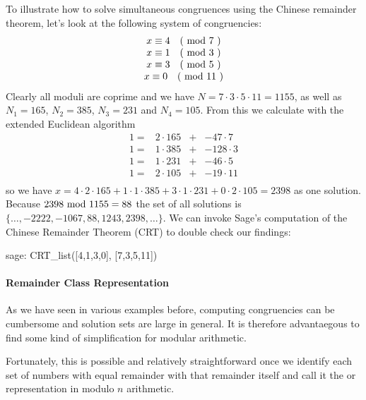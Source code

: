 \begin{example} To illustrate how to solve simultaneous congruences using the Chinese remainder theorem, let's look at the following system of congruencies:
$$
\begin{array}{c}
x \equiv 4 \quad \text{( mod } 7 \text{ )} \\
x \equiv 1 \quad \text{( mod } 3 \text{ )} \\
x \equiv 3 \quad \text{( mod } 5 \text{ )} \\
x \equiv 0 \quad \text{( mod } 11 \text{ )} \\
\end{array}
$$
Clearly all moduli are coprime and we have $ N = 7 \cdot 3 \cdot 5 \cdot 11 = 1155 $, as well as
$ N_1 = 165 $, $ N_2 = 385 $, $ N_3 = 231 $ and $ N_4 = 105 $. From this we calculate with the extended Euclidean algorithm
$$
\begin{array}{cccc}
 1 = & 2 \cdot 165  & + & -47 \cdot 7 \\
 1 = & 1 \cdot 385  & + &  -128 \cdot 3 \\
 1 = & 1 \cdot 231  & + &  -46 \cdot 5 \\
 1 = & 2 \cdot 105  & + &  -19 \cdot 11 \\
\end{array}
$$
so we have
$x = 4 \cdot 2 \cdot 165 + 1 \cdot 1 \cdot 385 + 3 \cdot 1 \cdot 231 + 0 \cdot 2 \cdot 105 = 2398$
as one solution. Because $ 2398 \text{ mod } 1155 = 88 $ the set of all solutions is
$ \{\ldots, -2222, -1067,88,1243, 2398, \ldots \} $. We can invoke Sage's computation of the Chinese Remainder Theorem (CRT) to double check our findings:
\begin{sagecommandline}
sage: CRT_list([4,1,3,0], [7,3,5,11])
\end{sagecommandline}
\end{example}

\paragraph{Remainder Class Representation}
\label{def:remainder_class_representation}
As we have seen in various examples before, computing congruencies can be cumbersome and solution sets are large in general. It is therefore advantaegous to find some kind of simplification for modular arithmetic.

Fortunately, this is possible and relatively straightforward once we identify each set of numbers with equal remainder with that remainder itself and call it the  or  representation in modulo $n$ arithmetic.

